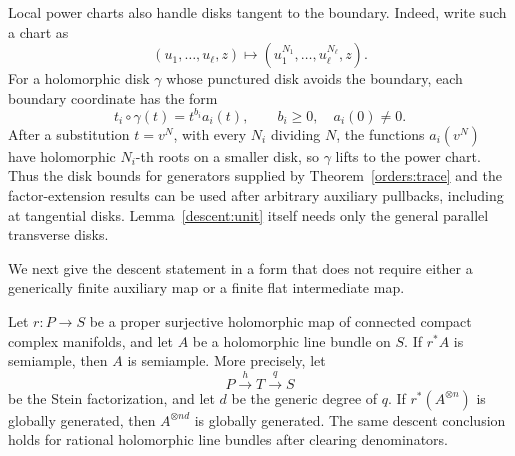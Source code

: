 \begin{remark}
\label{descent:tangential-disks}
Local power charts also handle disks tangent to the boundary.
Indeed, write such a chart as
\[
 (u_1,\ldots,u_\ell,z)\longmapsto
 (u_1^{N_1},\ldots,u_\ell^{N_\ell},z).
\]
For a holomorphic disk \(\gamma\) whose punctured disk avoids the
boundary, each boundary coordinate has the form
\[
 t_i\circ\gamma(t)=t^{b_i}a_i(t),
 \qquad b_i\geq0,\quad a_i(0)\ne0.
\]
After a substitution \(t=v^N\), with every \(N_i\) dividing \(N\),
the functions \(a_i(v^N)\) have holomorphic \(N_i\)-th roots on a
smaller disk, so \(\gamma\) lifts to the power chart.
Thus the disk bounds for generators supplied by
Theorem~\ref{orders:trace} and the factor-extension results can be
used after arbitrary auxiliary pullbacks, including at tangential
disks.  Lemma~\ref{descent:unit} itself needs only the general
parallel transverse disks.
\end{remark}

We next give the descent statement in a form that does not require
either a generically finite auxiliary map or a finite flat
intermediate map.

\begin{lemma}
\label{descent:semiample}
Let \(r:P\to S\) be a proper surjective holomorphic map of
connected compact complex manifolds, and let \(A\) be a
holomorphic line bundle on \(S\).
If \(r^*A\) is semiample, then \(A\) is semiample.
More precisely, let
\[
 P\xrightarrow{h}T\xrightarrow{q}S
\]
be the Stein factorization, and let \(d\) be the generic degree of
\(q\).
If \(r^*(A^{\otimes n})\) is globally generated, then
\(A^{\otimes nd}\) is globally generated.
The same descent conclusion holds for rational holomorphic line
bundles after clearing denominators.
\end{lemma}

